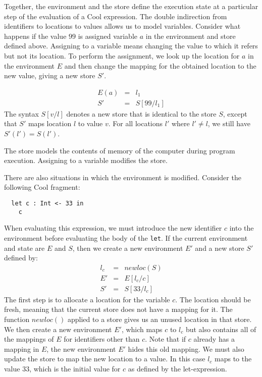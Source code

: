 \documentclass[11pt]{article}
\def\C#1{{\tt{}#1}}
\begin{document}
Together, the environment and the store define the execution state at
a particular step of the evaluation of a Cool expression. The double
indirection from identifiers to locations to values allows us to model
variables. Consider what happens if the value $99$ is assigned
variable $a$ in the environment and store defined above. Assigning to a
variable means changing the value to which it refers but not its
location. To perform the assignment, we look up the location for
$a$ in the environment $E$ and then change the mapping for the
obtained location to the new value, giving a new store $S'$.

\[
\begin{array}{rcl}
	E(a) & = & l_1 \\
	S'   & = & S[99/l_1]
\end{array}
\]
The syntax $S[v/l]$ denotes a new store that is identical to
the store $S$, except that $S'$ maps location $l$ to value
$v$. For all locations $l'$ where $l'\not=l$, we still have
$S'(l')=S(l')$.


The store models the contents of memory of the computer during program execution.
Assigning to a variable modifies the store.

There are also situations in which the environment is modified.
Consider the following Cool fragment:

\begin{center}
\begin{verbatim}
  let c : Int <- 33 in
    c
\end{verbatim}
\end{center}

When evaluating this expression, we must introduce the new
identifier $c$ into the environment before evaluating the body of
the \C{let}. If the current environment and state are $E$ and
$S$, then we create a new environment $E'$ and a new store $S'$
defined by:
\[
\begin{array}{rcl}
	l_c & = & newloc(S)\\
	E' & = & E[l_c/c]\\
	S' & = & S[33/l_c]
\end{array}
\]
The first step is to allocate a location for the variable $c$.  The
location should be fresh, meaning that the current store does not have
a mapping for it. The function $newloc()$ applied to a store gives us
an unused location in that store. We then create a new environment
$E'$, which maps $c$ to $l_c$ but also contains all of the mappings of
$E$ for identifiers other than $c$. Note that if $c$ already has a
mapping in $E$, the new environment $E'$ hides this old mapping.  We
must also update the store to map the new location to a value. In this
case $l_c$ maps to the value $33$, which is the initial value for $c$
as defined by the let-expression.  
\end{document}
